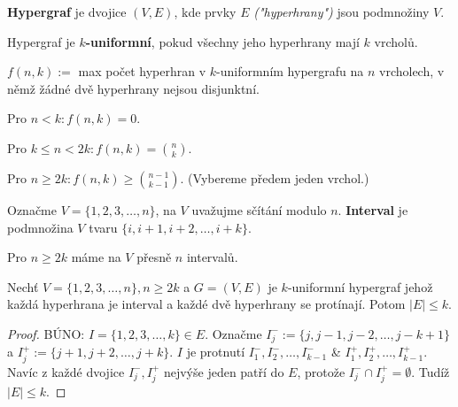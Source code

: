 \begin{definice}
	\textbf{Hypergraf} je dvojice $(V,E)$, kde prvky $E$ \textit{("hyperhrany")} jsou podmnožiny $V$.
\end{definice}

\begin{definice}
	Hypergraf je \textbf{$k$-uniformní}, pokud všechny jeho hyperhrany mají $k$ vrcholů.
\end{definice}

\begin{definice}
	$f(n,k):=$ max počet hyperhran v $k$-uniformním hypergrafu na $n$ vrcholech, v němž žádné dvě hyperhrany nejsou disjunktní.
\end{definice}

\begin{pozor}
	Pro $n < k: f(n,k) = 0$.
\end{pozor}

\begin{pozor}
	Pro $k \leq n < 2k: f(n,k) = \binom{n}{k}$.
\end{pozor}

\begin{pozor}
	Pro $n \geq 2k: f(n,k) \geq \binom{n-1}{k-1}$. (Vybereme předem jeden vrchol.)
\end{pozor}

\begin{definice}
	Označme $V= \{1,2,3, \dots ,n\}$, na $V$ uvažujme sčítání modulo $n$. \textbf{Interval} je podmnožina $V$ tvaru $\{i,i+1,i+2, \dots, i+k\}$.
\end{definice}

\begin{pozor}
	Pro $n \geq 2k$ máme na $V$ přesně $n$ intervalů.
\end{pozor}

\begin{lemma}
	Nechť $V = \{1,2,3,\dots,n\}, n \geq 2k$ a $G = (V,E)$ je $k$-uniformní hypergraf jehož každá hyperhrana je interval a každé dvě hyperhrany se protínají. Potom $|E| \leq k$.
\end{lemma}

\begin{proof}
	BÚNO: $I = \{1,2,3,\dots,k\} \in E$. Označme $I_{j}^{-}:= \{j,j-1,j-2, \dots, j-k+1\}$ a $I_{j}^{+}:= \{j+1,j+2, \dots, j+k\}$. $I$ je protnutí $I_{1}^{-}, I_{2}^{-}, \dots, I_{k-1}^{-}$ \& $I_{1}^{+}, I_{2}^{+}, \dots, I_{k-1}^{+}$. Navíc z každé dvojice $I_{j}^{-},I_{j}^{+}$ nejvýše jeden patří do $E$, protože $I_{j}^{-} \cap I_{j}^{+} = \emptyset$. Tudíž $|E| \leq k$.
\end{proof}

